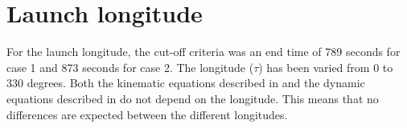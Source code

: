 
%



%
% 


\section{Launch longitude}
\label{sec:launchLongitude}
For the launch longitude, the cut-off criteria was an end time of 789 seconds for case 1 and 873 seconds for case 2. The longitude ($\tau$) has been varied from 0 to 330 degrees. Both the kinematic equations described in  and the dynamic equations described in  do not depend on the longitude. This means that no differences are expected between the different longitudes. \\


